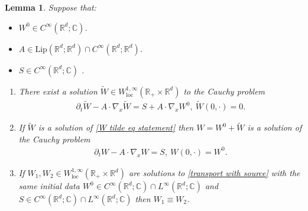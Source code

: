 \documentclass[11pt,reqno]{amsart}
\newtheorem{lem}[thm]{Lemma}
\numberwithin{equation}{section}
\begin{document}
\begin{lem}\label{Duhamel principle}
Suppose that: 
\begin{itemize}
    \item $W^{0}\in C^{\infty}(\mathbb{R}^{d};\mathbb{C})$.
    \item $A \in \mathrm{Lip}(\mathbb{R}^{d};\mathbb{R}^{d})\cap C^{\infty}(\mathbb{R}^{d};\mathbb{R}^{d})$.
    \item $S\in C^{\infty}(\mathbb{R}^{d};\mathbb{C})$ . 
\end{itemize}
\begin{enumerate}
    \item There exist a solution $\widetilde{W}\in W^{1,\infty}_{\mathrm{loc}}(\mathbb{R}_{+}\times \mathbb{R}^{d})$ to the  Cauchy problem 
\begin{align}
\partial_{t}\widetilde{W}-A\cdot \nabla_{x}\widetilde{W}=S+A\cdot \nabla_{x}W^{\mathrm{0}}, \ \widetilde{W}(0,\cdot)=0. \label{W tilde eq statement} 
\end{align}
\item If $\widetilde{W}$ is a solution of \eqref{W tilde eq statement} then   $W=W^{0}+\widetilde{W}$ is a solution of the Cauchy problem 
\begin{align}
\partial_{t}W-A\cdot \nabla_{x}W=S,\ W(0,\cdot)=W^{0}. \label{transport with source}    
\end{align}
\item  If $W_{1},W_{2}\in W^
{1,\infty}_{\mathrm{loc}}(\mathbb{R}_{+}\times \mathbb{R}^{d})$ are solutions to \eqref{transport with source} with the same initial data $W^{0}\in C^{\infty}(\mathbb{R}^{d};\mathbb{C})\cap L^{\infty}(\mathbb{R}^{d};\mathbb{C})$ and $S\in C^{\infty}(\mathbb{R}^{d};\mathbb{C})\cap L^{\infty}(\mathbb{R}^{d};\mathbb{C})$ then $W_{1}\equiv W_{2}$. 
\end{enumerate}
\end{lem}
\end{document}
